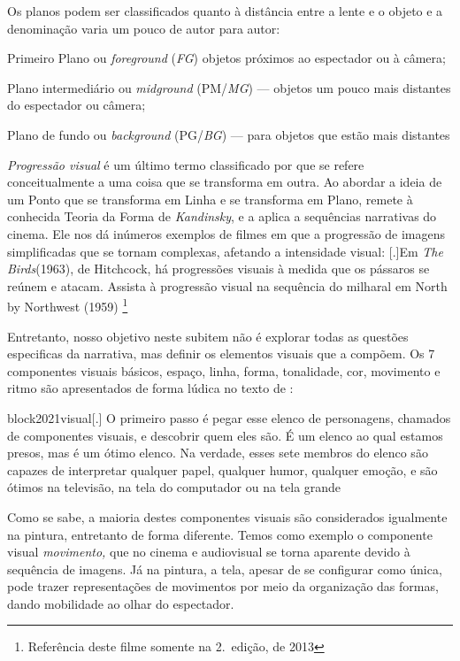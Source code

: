 Os planos podem ser classificados quanto à distância entre a lente e o
objeto e a denominação varia um pouco de autor para autor:

Primeiro Plano ou \emph{foreground} (\emph{FG}) objetos próximos ao
espectador ou à câmera;

Plano intermediário ou \emph{midground} (PM/\emph{MG}) --- objetos um
pouco mais distantes do espectador ou câmera;

Plano de fundo ou \emph{background} (PG/\emph{BG}) --- para objetos que
estão mais distantes

\emph{Progressão visual} é um último termo classificado por
\textcite{block2021visual} que se refere conceitualmente
a uma coisa que se transforma em outra. Ao abordar a ideia de um Ponto
que se transforma em Linha e se transforma em Plano, remete à conhecida
Teoria da Forma de \emph{Kandinsky}, e a aplica a sequências narrativas
do cinema. Ele nos dá inúmeros exemplos de filmes em que a progressão de
imagens simplificadas que se tornam complexas, afetando a intensidade
visual: [.]{Em \emph{The Birds}\footnotemark (1963),
	de Hitchcock, há progressões visuais à
	medida que os pássaros se reúnem e atacam. Assista à progressão visual
	na sequência do milharal em North by Northwest
	(1959)\footnotemark}%
\footnote{Referência deste filme somente na 2\textordfeminine.~edição, de 2013}%

Entretanto, nosso objetivo neste subitem não é explorar todas as
questões especificas da narrativa, mas definir os elementos visuais que
a compõem. Os 7 componentes visuais básicos, espaço, linha, forma,
tonalidade, cor, movimento e ritmo são apresentados de forma lúdica no
texto de \textcite{block2021visual}:

\begin{displaycquote}[9]{block2021visual}[.]
	O primeiro passo é pegar esse elenco de personagens, chamados de
	componentes visuais, e descobrir quem eles são. É um elenco ao qual
	estamos presos, mas é um ótimo elenco. Na verdade, esses sete membros do
	elenco são capazes de interpretar qualquer papel, qualquer humor,
	qualquer emoção, e são ótimos na televisão, na tela do computador ou na
	tela grande
\end{displaycquote}

Como se sabe, a maioria destes componentes visuais são considerados
igualmente na pintura, entretanto de forma diferente. Temos como
exemplo o componente visual \emph{movimento,} que no cinema e
audiovisual se torna aparente devido à sequência de imagens. Já na
pintura, a tela, apesar de se configurar como única, pode trazer
representações de movimentos por meio da organização das formas, dando
mobilidade ao olhar do espectador.

